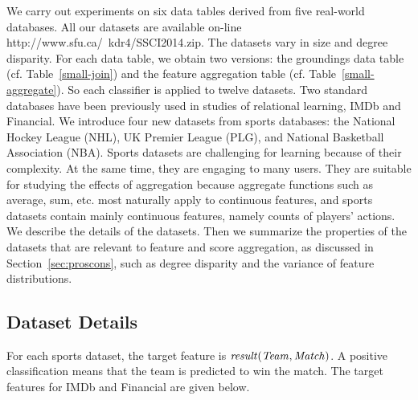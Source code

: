 \documentclass[conference]{IEEEtran}
\begin{document}


We carry out experiments on six data tables derived from five real-world databases. All our datasets are available on-line http://www.sfu.ca/~kdr4/SSCI2014.zip. The datasets vary in size and degree disparity. For each data table, we obtain two versions: the groundings data table (cf. Table~\ref{small-join}) and the feature aggregation table (cf.
Table~\ref{small-aggregate}). So each classifier is applied to twelve datasets.
Two standard databases  have been previously used in studies of relational learning, IMDb and Financial. We introduce four new datasets from sports databases: the National Hockey League (NHL), UK Premier League (PLG), and National Basketball Association (NBA). Sports datasets are challenging for learning because of their complexity. At the same time, they are engaging to many users. They are suitable for studying the effects of aggregation because aggregate functions such as average, sum, etc. most naturally apply to continuous features, and sports datasets contain mainly continuous features, namely counts of players' actions. We describe the details of the datasets. Then we summarize the properties of the datasets that are relevant to feature and score aggregation, as discussed in Section~\ref{sec:proscons}, such as degree disparity and the variance of feature distributions.

\subsection{Dataset Details}

For each sports dataset, the target feature is $\it{result(Team,Match)}$. A positive classification means that the team is predicted to win the match. The target features for IMDb and Financial are given below.
\end{document}
